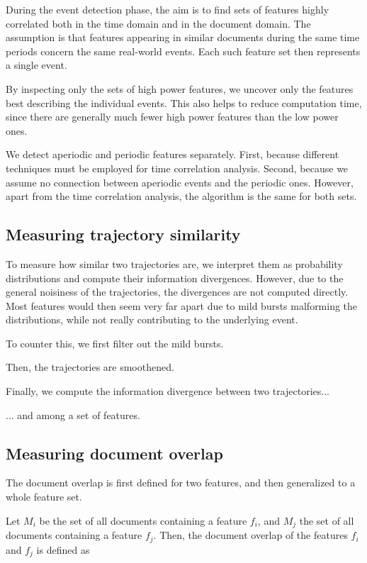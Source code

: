 During the event detection phase, the aim is to find sets of features highly correlated both in the time domain and in the document domain. The assumption is that features appearing in similar documents during the same time periods concern the same real-world events. Each such feature set then represents a single event.

By inspecting only the sets of high power features, we uncover only the features best describing the individual events. This also helps to reduce computation time, since there are generally much fewer high power features than the low power ones.

We detect aperiodic and periodic features separately. First, because different techniques must be employed for time correlation analysis. Second, because we assume no connection between aperiodic events and the periodic ones. However, apart from the time correlation analysis, the algorithm is the same for both sets.

\subsection{Measuring trajectory similarity}
To measure how similar two trajectories are, we interpret them as probability distributions and compute their information divergences. However, due to the general noisiness of the trajectories, the divergences are not computed directly. Most features would then seem very far apart due to mild bursts malforming the distributions, while not really contributing to the underlying event.

To counter this, we first filter out the mild bursts.

Then, the trajectories are smoothened.

Finally, we compute the information divergence between two trajectories...

... and among a set of features.

\subsection{Measuring document overlap}
The document overlap is first defined for two features, and then generalized to a whole feature set.

Let $M_{i}$ be the set of all documents containing a feature $f_{i}$, and $M_{j}$ the set of all documents containing a feature $f_{j}$. Then, the document overlap of the features $f_{i}$ and $f_{j}$ is defined as

